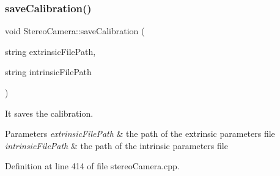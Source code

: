 \subsubsection{\texorpdfstring{save\+Calibration()}{saveCalibration()}}
{\footnotesize\ttfamily void Stereo\+Camera\+::save\+Calibration (\begin{DoxyParamCaption}\item[{string}]{extrinsic\+File\+Path,  }\item[{string}]{intrinsic\+File\+Path }\end{DoxyParamCaption})}



It saves the calibration. 


\begin{DoxyParams}{Parameters}
{\em extrinsic\+File\+Path} & the path of the extrinsic parameters file \\
\hline
{\em intrinsic\+File\+Path} & the path of the intrinsic parameters file \\
\hline
\end{DoxyParams}


Definition at line 414 of file stereo\+Camera.\+cpp.


